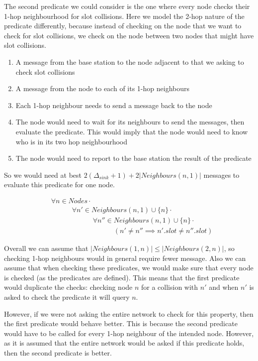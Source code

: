 The second predicate we could consider is the one where every node checks their 1-hop neighbourhood for slot collisions. Here we model the 2-hop nature of the predicate differently, because instead of checking on the node that we want to check for slot collisions, we check on the node between two nodes that might have slot collisions.

\begin{enumerate}
	\item A message from the base station to the node adjacent to that we asking to check slot collisions
	\item A message from the node to each of its 1-hop neighbours
	\item Each 1-hop neighbour needs to send a message back to the node
	\item The node would need to wait for its neighbours to send the messages, then evaluate the predicate. This would imply that the node would need to know who is in its two hop neighbourhood
	\item The node would need to report to the base station the result of the predicate
\end{enumerate}

So we would need at best $2(\Delta_{sink} + 1) + 2|Neighbours(n, 1)|$ messages to evaluate this predicate for one node.

\begin{align}
\label{eq:1-hop-slot-pred}
&				\forall n \in Nodes \cdot \\
& \hspace{3em}		\forall n' \in Neighbours(n, 1) \cup \{n\} \cdot \\
& \hspace{6em}			\forall n'' \in Neighbours(n, 1) \cup \{n\} \cdot \\
& \hspace{9em}				(n' \not= n'' \implies n'.slot \neq n''.slot)
\end{align}

Overall we can assume that $|Neighbours(1, n)| \leq |Neighbours(2, n)|$, so checking 1-hop neighbours would in general require fewer message. Also we can assume that when checking these predicates, we would make sure that every node is checked (as the predicates are defined). This means that the first predicate would duplicate the checks: checking node $n$ for a collision with $n'$ and when $n'$ is asked to check the predicate it will query $n$.

However, if we were not asking the entire network to check for this property, then the first predicate would behave better. This is because the second predicate would have to be called for every 1-hop neighbour of the intended node. However, as it is assumed that the entire network would be asked if this predicate holds, then the second predicate is better.


